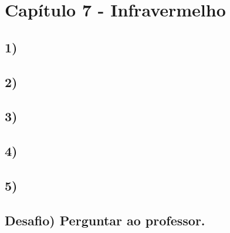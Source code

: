\section*{Capítulo 7 - Infravermelho}

    \subsection*{1)}
    
    \subsection*{2)}
    
    \subsection*{3)}
    
    \subsection*{4)}
    
    \subsection*{5)}
    
    \subsection*{Desafio) Perguntar ao professor.}
    